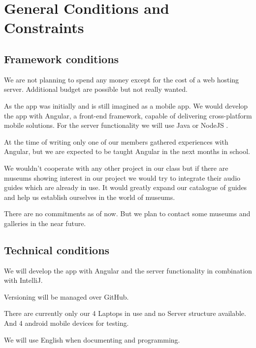 \documentclass[12pt]{article}
\theoremstyle{definition}
\newenvironment{text}{
}{}
\begin{document}
\pagebreak
 
\section{General Conditions and Constraints}

\subsection{Framework conditions} 
\begin{text}

We are not planning to spend any money except for the cost of a web hosting server. Additional budget are possible but not really wanted.\newline

As the app was initially and is still imagined as a mobile app. We would develop the app with Angular, a front-end framework, capable of delivering cross-platform mobile solutions. For the server functionality we will use Java or NodeJS .\newline
 
At the time of writing only one of our members gathered experiences with Angular, but we are expected to be taught Angular in the next months in school.\newline
 
We wouldn't cooperate with any other project in our class but if there are museums showing interest in our project we would try to integrate their audio guides
which are already in use. It would greatly expand our catalogue of guides and help us establish ourselves in the world of museums.\newline
 
There are no commitments as of now. But we plan to contact some museums and galleries in the near future.

\end{text}

\subsection{Technical conditions}
\begin{text}

We will develop the app with Angular and the server functionality in combination with IntelliJ.

Versioning will be managed over GitHub.\newline
 
There are currently only our 4 Laptops in use and no Server structure available. And 4 android mobile devices for testing.\newline
 
We will use English when documenting and programming.

\end{text}
  
\end{document}
